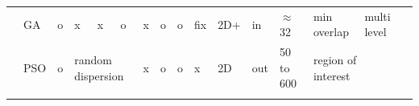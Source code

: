 \begin{landscape}
\begin{table}[]
\begin{tabular}{@{}  l|p{1.6cm} p{1.7cm} l  l p{0.659cm} p{0.612cm}p{.659cm} p{1.11cm} p{1.5cm} p{1.57cm}p{0.9cm}p{1.6cm}p{1.3cm}p{1.2cm} p{1.2cm}@{}}
\multicolumn{1}{l|}{\cellcolor[HTML]{FFFFFF}\cite{83*van2009}}  & GA                                                                                                             & o                                                                     & x                                              & x                                              & o                                              & x                                                & o                                                 & o                                                 & fix                                                       & 2D+                                                                                                             & in                                                           & $\approx$ 32                                                                                              & min overlap                                                                                                                 & multi level                   &                                 \\
\rowcolor[HTML]{EFEFEF} 
\multicolumn{1}{l|}{\cellcolor[HTML]{EFEFEF}\cite{84*xu2011}}  & PSO                                                                                                            & o                                                                     & \multicolumn{3}{p{0.89cm}}{\cellcolor[HTML]{EFEFEF}random \newline dispersion}                                                                                    & x                                                & o                                                 & o                                                 & x                                                         & 2D                                                                                                              & out                                                          & 50 to 600                                                                                                 & \multicolumn{2}{l}{\cellcolor[HTML]{EFEFEF}region of interest}                                                                                              &                                 \\
\rowcolor[HTML]{FFFFFF} 

\end{tabular}
\end{table}
\end{landscape}
